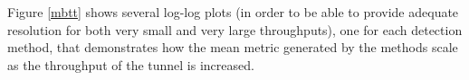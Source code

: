 \documentclass{llncs}
\begin{document}
Figure \ref{mbtt} shows several log-log plots (in order to be able to provide
adequate resolution for both very small and very large throughputs), one for
each detection method, that demonstrates how the mean metric generated by the
methods scale as the throughput of the tunnel is increased.

%
%
%
%
%
\end{document}
